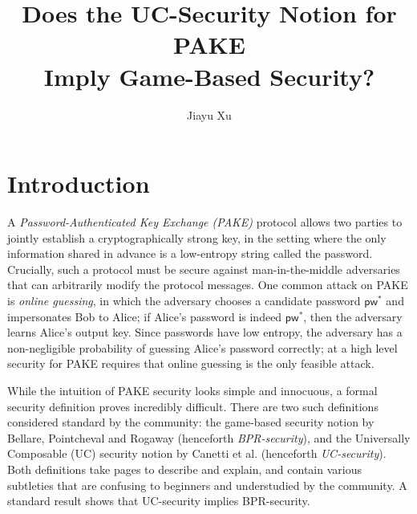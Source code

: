 \documentclass{article}
\newcommand{\pw}{\mathsf{pw}}
\begin{document}
\title{Does the UC-Security Notion for PAKE \\ Imply Game-Based Security?}

\author{Jiayu Xu}
\date{}

\maketitle

\section{Introduction}
A \emph{Password-Authenticated Key Exchange (PAKE)} protocol allows two parties to jointly establish a cryptographically strong key, in the setting where the only information shared in advance is a low-entropy string called the password. Crucially, such a protocol must be secure against man-in-the-middle adversaries that can arbitrarily modify the protocol messages. One common attack on PAKE is \emph{online guessing}, in which the adversary chooses a candidate password $\pw^*$ and impersonates Bob to Alice; if Alice's password is indeed $\pw^*$, then the adversary learns Alice's output key. Since passwords have low entropy, the adversary has a non-negligible probability of guessing Alice's password correctly; at a high level security for PAKE requires that online guessing is the only feasible attack.

While the intuition of PAKE security looks simple and innocuous, a formal security definition proves incredibly difficult. There are two such definitions considered standard by the community: the game-based security notion by Bellare, Pointcheval and Rogaway \cite{EC:BelPoiRog00} (henceforth \emph{BPR-security}), and the Universally Composable (UC) security notion by Canetti et al. \cite{EC:CHKLM05} (henceforth \emph{UC-security}). Both definitions take pages to describe and explain, and contain various subtleties that are confusing to beginners and understudied by the community. A standard result \cite[Appendix~A]{EC:CHKLM05} shows that UC-security implies BPR-security.
\end{document}
